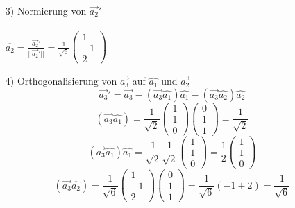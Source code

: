 \documentclass{article}
\begin{document}
\begin{itemize}
\begin{equation*}
    \end{equation*}
    \item[3)] Normierung von $\vec{a_2}'$\\\\$\hat{a_2}=\frac{\vec{a_2}'}{||\vec{a_2}'||}=\frac{1}{\sqrt{6}}\left(\begin{array}{c}1 \\ -1 \\ 2\end{array}\right)$
    \item[4)] Orthogonalisierung von $\vec{a_3}$ auf $\hat{a_1}$ und $\vec{a_2}$\\
        \begin{equation*}
            \vec{a_3}'=\vec{a_3}-\left(\vec{a_3}\hat{a_1}\right)\hat{a_1}-\left(\vec{a_3}\hat{a_2}\right)\hat{a_2}
        \end{equation*}
        \begin{equation*}
            \left(\vec{a_3}\hat{a_1}\right)=\frac{1}{\sqrt{2}}\left(\begin{array}{c}1 \\ 1 \\ 0\end{array}\right)\left(\begin{array}{c}0 \\ 1 \\ 1\end{array}\right)=\frac{1}{\sqrt{2}}
        \end{equation*}
        \begin{equation*}
            \left(\vec{a_3}\hat{a_1}\right)\hat{a_1}=\frac{1}{\sqrt{2}}\frac{1}{\sqrt{2}}\left(\begin{array}{c}1 \\ 1 \\ 0\end{array}\right)=\frac{1}{2}\left(\begin{array}{c}1 \\ 1 \\ 0\end{array}\right)
        \end{equation*}
        \begin{equation*}
            \left(\vec{a_3}\hat{a_2}\right)=\frac{1}{\sqrt{6}}\left(\begin{array}{c}1 \\ -1 \\ 2\end{array}\right)\left(\begin{array}{c}0 \\ 1 \\ 1\end{array}\right)=\frac{1}{\sqrt{6}}\left(-1+2\right)=\frac{1}{\sqrt{6}}

\end{equation*}
\end{itemize}
\end{document}
